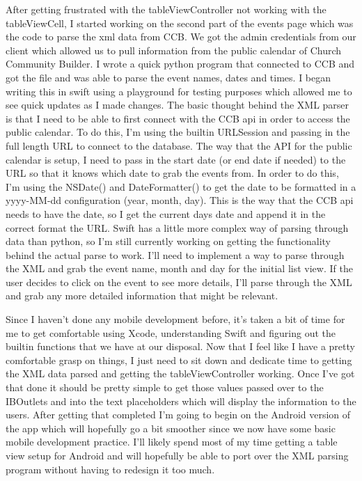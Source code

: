 \documentclass[letterpaper,10pt,draftclsnofoot,onecolumn,titlepage]{IEEEtran}
\begin{document}
	After getting frustrated with the tableViewController not working with the tableViewCell, I started working on the second part of the events page which was the code to parse the xml data from CCB.
	We got the admin credentials from our client which allowed us to pull information from the public calendar of Church Community Builder.
	I wrote a quick python program that connected to CCB and got the file and was able to parse the event names, dates and times.
	I began writing this in swift using a playground for testing purposes which allowed me to see quick updates as I made changes.
	The basic thought behind the XML parser is that I need to be able to first connect with the CCB api in order to access the public calendar.
	To do this, I'm using the builtin URLSession and passing in the full length URL to connect to the database.
	The way that the API for the public calendar is setup, I need to pass in the start date (or end date if needed) to the URL so that it knows which date to grab the events from.
	In order to do this, I'm using the NSDate() and DateFormatter() to get the date to be formatted in a yyyy-MM-dd configuration (year, month, day).
	This is the way that the CCB api needs to have the date, so I get the current days date and append it in the correct format the URL.
	Swift has a little more complex way of parsing through data than python, so I'm still currently working on getting the functionality behind the actual parse to work.
	I'll need to implement a way to parse through the XML and grab the event name, month and day for the initial list view.
	If the user decides to click on the event to see more details, I'll parse through the XML and grab any more detailed information that might be relevant.

	Since I haven't done any mobile development before, it's taken a bit of time for me to get comfortable using Xcode, understanding Swift and figuring out the builtin functions that we have at our disposal.
	Now that I feel like I have a pretty comfortable grasp on things, I just need to sit down and dedicate time to getting the XML data parsed and getting the tableViewController working.
	Once I've got that done it should be pretty simple to get those values passed over to the IBOutlets and into the text placeholders which will display the information to the users.
	After getting that completed I'm going to begin on the Android version of the app which will hopefully go a bit smoother since we now have some basic mobile development practice.
	I'll likely spend most of my time getting a table view setup for Android and will hopefully be able to port over the XML parsing program without having to redesign it too much.
\end{document}
